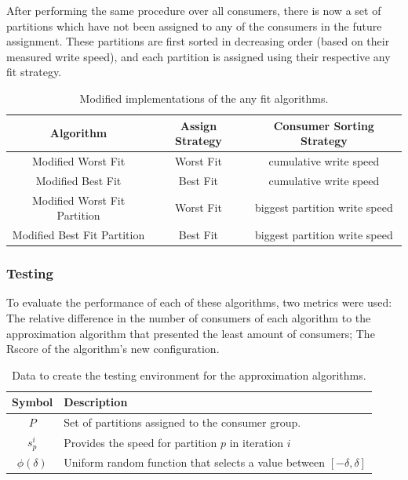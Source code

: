 After performing the same procedure over all consumers, there is now a set of
partitions which have not been assigned to any of the consumers in the future
assignment. These partitions are first sorted in decreasing order (based on
their measured write speed), and each partition is assigned using their
respective any fit strategy.

\begin{table}[H] \centering \caption{Modified implementations of the any fit
    algorithms.} \begin{tabular}{ |c|c|c| } \hline \textbf{Algorithm} &
        \textbf{Assign Strategy} & \textbf{Consumer Sorting Strategy} \\ \hline
        Modified Worst Fit & Worst Fit & cumulative write speed \\ Modified Best
        Fit & Best Fit & cumulative write speed \\ Modified Worst Fit Partition
        & Worst Fit & biggest partition write speed \\ Modified Best Fit
        Partition &  Best Fit & biggest partition write speed \\ \hline
    \end{tabular} \end{table}

\subsubsection{Testing} \label{c3subsub:testing}

To evaluate the performance of each of these algorithms, two metrics were used:
    The relative difference in the number of consumers of each algorithm to the
    approximation algorithm that presented the least amount of consumers; The
    Rscore of the algorithm's new configuration.

\begin{table}[H] \centering \caption{Data to create the testing environment for
    the approximation algorithms.} \label{table:testing_data} \begin{tabular}{
            |c|l| } \hline \textbf{Symbol} & \textbf{Description} \\ \hline $P$
        & Set of partitions assigned to the consumer group. \\ $s_p^i$ &
    Provides the speed for partition $p$ in iteration $i$ \\ $\phi(\delta)$ &
    Uniform random function that selects a value between $[-\delta, \delta]$\\
    \hline \end{tabular} \end{table}

